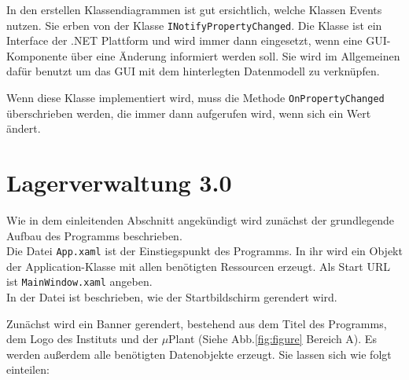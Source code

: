     In den erstellen Klassendiagrammen ist gut ersichtlich, welche Klassen Events nutzen.
    Sie erben von der Klasse \verb|INotifyPropertyChanged|.
    Die Klasse ist ein Interface der .NET Plattform und wird immer dann eingesetzt, wenn eine GUI-Komponente über eine Änderung
    informiert werden soll. Sie wird im Allgemeinen dafür benutzt um das GUI mit dem hinterlegten Datenmodell zu verknüpfen.

    Wenn diese Klasse implementiert wird, muss die Methode \verb|OnPropertyChanged| überschrieben werden, die immer dann aufgerufen wird,
    wenn sich ein Wert ändert. 
    \clearpage

    \section {Lagerverwaltung 3.0}

    Wie in dem einleitenden Abschnitt angekündigt wird zunächst der grundlegende Aufbau des Programms beschrieben.\\

    Die Datei \verb|App.xaml| ist der Einstiegspunkt des Programms.
    In ihr wird ein Objekt der Application-Klasse mit allen benötigten Ressourcen erzeugt.
    Als Start URL ist \verb|MainWindow.xaml| angeben.\\
    In der Datei ist beschrieben, wie der Startbildschirm gerendert wird.

    Zunächst wird ein Banner gerendert, bestehend aus dem Titel des Programms, dem Logo des Instituts und der $\mu$Plant
    (Siehe Abb.\ref{fig:figure} Bereich \glqq A\grqq).
    Es werden außerdem alle benötigten Datenobjekte erzeugt.
    Sie lassen sich wie folgt einteilen:
    
